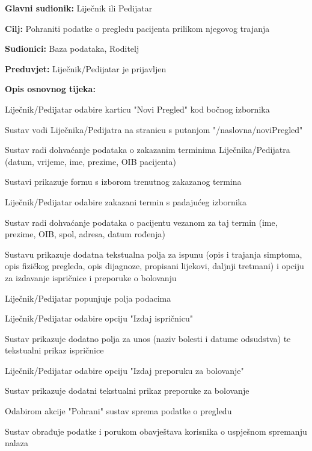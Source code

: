 					
					
					
				\noindent {}
					\begin{packed_item}
						
						\item \textbf{Glavni sudionik: }Liječnik ili Pedijatar
						\item  \textbf{Cilj:} Pohraniti podatke o pregledu pacijenta prilikom njegovog trajanja
						\item  \textbf{Sudionici:} Baza podataka, Roditelj
						\item  \textbf{Preduvjet:} Liječnik/Pedijatar je prijavljen
						\item  \textbf{Opis osnovnog tijeka:}
						
						\item[] \begin{packed_enum}
							\item Liječnik/Pedijatar odabire karticu "Novi Pregled" kod bočnog izbornika
							\item Sustav vodi Liječnika/Pedijatra na stranicu s putanjom "/naslovna/noviPregled"
							\item Sustav radi dohvaćanje podataka o zakazanim terminima Liječnika/Pedijatra (datum, vrijeme, ime, prezime, OIB pacijenta)
							\item Sustavi prikazuje formu s izborom trenutnog zakazanog termina
							\item Liječnik/Pedijatar odabire zakazani termin s padajućeg izbornika
							\item Sustav radi dohvaćanje podataka o pacijentu vezanom za taj termin (ime, prezime, OIB, spol, adresa, datum rođenja)
							\item Sustavu prikazuje dodatna tekstualna polja za ispunu (opis i trajanja simptoma, opis fizičkog pregleda, opis dijagnoze, propisani lijekovi, daljnji tretmani) i opciju za izdavanje ispričnice i preporuke o bolovanju
							\item Liječnik/Pedijatar popunjuje polja podacima
							\item Liječnik/Pedijatar odabire opciju "Izdaj ispričnicu"
							\item Sustav prikazuje dodatno polja za unos (naziv bolesti i datume odsudstva) te tekstualni prikaz ispričnice
							\item Liječnik/Pedijatar odabire opciju "Izdaj preporuku za bolovanje"
							\item Sustav prikazuje dodatni tekstualni prikaz preporuke za bolovanje
							\item Odabirom akcije "Pohrani" sustav sprema podatke o pregledu 
							\item Sustav obrađuje podatke i porukom obavještava korisnika o uspješnom spremanju nalaza
						\end{packed_enum}
						

\end{packed_item}
